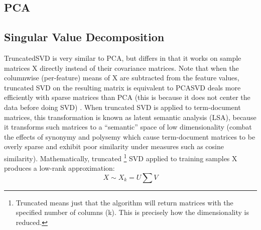 \documentclass[11pt]{article}
\begin{document}
\subsection{PCA}
\subsection{Singular Value Decomposition}
TruncatedSVD is very similar to PCA, but differs in that it works on sample matrices X directly instead of their covariance matrices. Note that when the columnwise (per-feature) means of X are subtracted from the feature values, truncated SVD on the resulting matrix is equivalent to PCASVD deals more efficiently with sparse matrices than PCA (this is because it does not center the data before doing SVD) \cite{halko2009finding}. When truncated SVD is applied to term-document matrices, this transformation is known as latent semantic analysis (LSA), because it transforms such matrices to a “semantic” space of low dimensionality (combat the effects of synonymy and polysemy which cause term-document matrices to be overly sparse and exhibit poor similarity under measures such as cosine similarity).
Mathematically, truncated \footnote{Truncated means just that the algorithm will return matrices with the specified number of columns (k). This is precisely how the dimensionality is reduced.} SVD applied to training samples X produces a low-rank approximation:
\begin{equation}
X \sim X_k = U \sum V
\end{equation}
\end{document}

